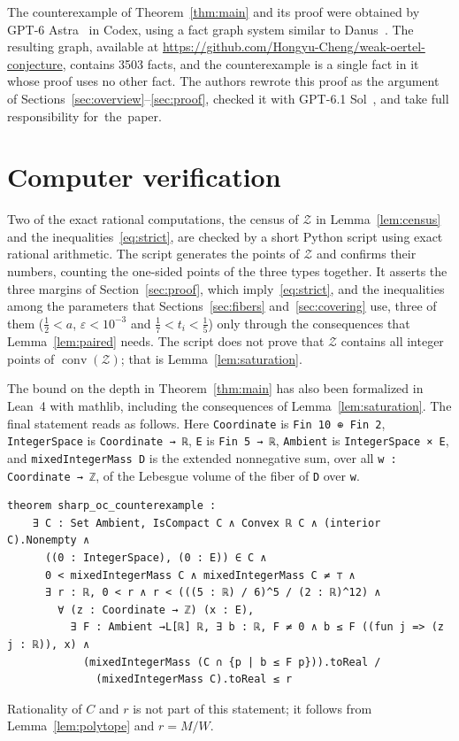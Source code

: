 \documentclass[11pt]{article}
\makeatletter
\renewcommand\paragraph{\@startsection{paragraph}{4}{\z@}{1.6ex \@plus .5ex \@minus .2ex}{-1em}{\normalfont\normalsize\bfseries}}
\newcommand{\Zcal}{\mathcal{Z}}
\newcommand{\1}{\mathbf{1}}
\DeclareMathOperator{\conv}{conv}
\makeatother
\begin{document}
\paragraph{AI disclosure.}
The counterexample of Theorem~\ref{thm:main} and its proof were obtained by \mbox{GPT-6} Astra~\cite{gpt6astra} in Codex, using a
fact graph system similar to Danus~\cite{danus}. The resulting graph, available at
\url{https://github.com/Hongyu-Cheng/weak-oertel-conjecture}, contains 3503 facts, and the counterexample is a single fact
in it whose proof uses no other fact. The authors rewrote this proof as the argument of
Sections~\ref{sec:overview}--\ref{sec:proof}, checked it with \mbox{GPT-6.1} Sol~\cite{gpt61sol}, and take full responsibility
for~the~paper.

\appendix
\section{Computer verification}\label{sec:lean}

Two of the exact rational computations, the census of $\Zcal$ in Lemma~\ref{lem:census} and the
inequalities~\eqref{eq:strict}, are checked by a short Python script using exact rational arithmetic. The script generates
the points of $\Zcal$ and confirms their numbers, counting the one-sided points of the three types together. It asserts the
three margins of Section~\ref{sec:proof}, which imply~\eqref{eq:strict}, and the inequalities among the parameters that
Sections~\ref{sec:fibers} and~\ref{sec:covering} use, three of them ($\frac12<a$, $\varepsilon<10^{-3}$ and
$\frac17<t_i<\frac15$) only through the consequences that Lemma~\ref{lem:paired} needs. The script does not prove that
$\Zcal$ contains all integer points of $\conv(\Zcal)$; that is Lemma~\ref{lem:saturation}.

The bound on the depth in Theorem~\ref{thm:main} has also been formalized in Lean~4 with mathlib, including the
consequences of Lemma~\ref{lem:saturation}. The final statement reads as follows. Here \texttt{Coordinate} is
\texttt{Fin 10 ⊕ Fin 2}, \texttt{IntegerSpace} is \texttt{Coordinate → ℝ}, \texttt{E} is \texttt{Fin 5 → ℝ},
\texttt{Ambient} is \texttt{IntegerSpace × E}, and \texttt{mixedIntegerMass D} is the extended nonnegative sum, over all
\texttt{w : Coordinate → ℤ}, of the Lebesgue volume of the fiber of \texttt{D} over \texttt{w}.
\begin{Verbatim}
theorem sharp_oc_counterexample :
    ∃ C : Set Ambient, IsCompact C ∧ Convex ℝ C ∧ (interior C).Nonempty ∧
      ((0 : IntegerSpace), (0 : E)) ∈ C ∧
      0 < mixedIntegerMass C ∧ mixedIntegerMass C ≠ ⊤ ∧
      ∃ r : ℝ, 0 < r ∧ r < (((5 : ℝ) / 6)^5 / (2 : ℝ)^12) ∧
        ∀ (z : Coordinate → ℤ) (x : E),
          ∃ F : Ambient →L[ℝ] ℝ, ∃ b : ℝ, F ≠ 0 ∧ b ≤ F ((fun j => (z j : ℝ)), x) ∧
            (mixedIntegerMass (C ∩ {p | b ≤ F p})).toReal /
              (mixedIntegerMass C).toReal ≤ r
\end{Verbatim}
Rationality of $C$ and $r$ is not part of this statement; it follows from Lemma~\ref{lem:polytope} and $r=M/W$.
\end{document}
